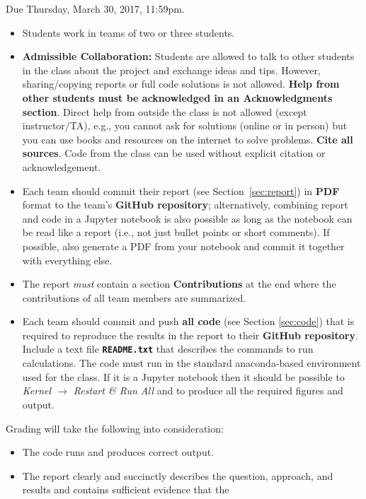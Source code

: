 \documentclass[letterpaper]{scrartcl}
\begin{document}
\begin{framed}
  \noindent
  Due Thursday, March 30, 2017, 11:59pm.
  \begin{itemize}
  \item Students work in teams of two or three students.
  \item \textbf{Admissible Collaboration:} Students are allowed to
    talk to other students in the class about the project and exchange
    ideas and tips. However, sharing/copying reports or full code
    solutions is not allowed. \textbf{Help from other students must be
      acknowledged in an Acknowledgments section}.  Direct help from
    outside the class is not allowed (except instructor/TA), e.g., you
    cannot ask for solutions (online or in person) but you can use
    books and resources on the internet to solve
    problems. \textbf{Cite all sources}. Code from the class can be
    used without explicit citation or acknowledgement.
  \item Each team should commit their  report (see
    Section~\ref{sec:report}) in \textbf{PDF} format to the team's
    \textbf{GitHub repository}; alternatively, combining report and
    code in a Jupyter notebook is also possible as long as the
    notebook can be read like a report (i.e., not just bullet points
    or short comments). If possible, also generate a PDF from your
    notebook and commit it together with everything else.
  \item The report \emph{must} contain a section
    \textbf{Contributions} at the end where the contributions of all
    team members are summarized. 
  \item Each team should commit and push \textbf{all code} (see
    Section \ref{sec:code}) that is required to reproduce the results
    in the report to their \textbf{GitHub repository}. Include a
    text file \textbf{\texttt{README.txt}} that describes the commands
    to run calculations. The code must run in the standard
    anaconda-based environment used for the class. If it is a Jupyter
    notebook then it should be possible to \emph{Kernel $\rightarrow$
      Restart \& Run All} and to produce all the required figures and
    output.
  \end{itemize}
  Grading will take the following into consideration:
  \begin{itemize}
  \item The code runs and produces correct output.
  \item The report clearly and succinctly describes the question,
    approach, and results and contains sufficient evidence that the

\end{itemize}
\end{framed}
\end{document}
